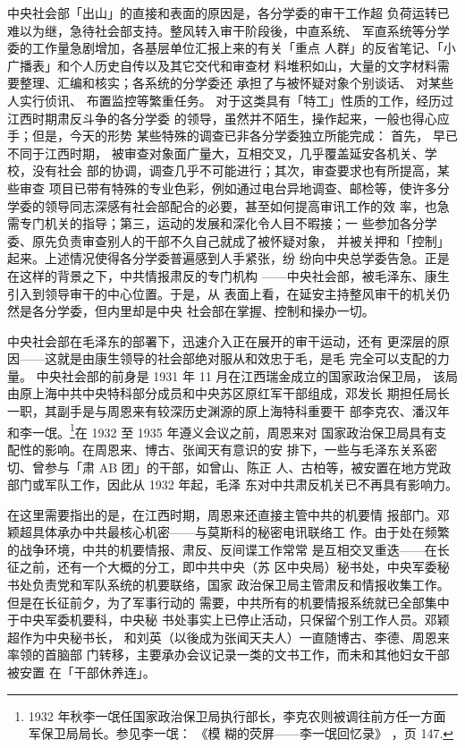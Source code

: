 中央社会部「出山」的直接和表面的原因是，各分学委的审干工作超
负荷运转已难以为继，急待社会部支持。整风转入审干阶段後，中直系统、
军直系统等分学委的工作量急剧增加，各基层单位汇报上来的有关「重点
人群」的反省笔记、「小广播表」和个人历史自传以及其它交代和审查材
料堆积如山，大量的文字材料需要整理、汇编和核实；各系统的分学委还
承担了与被怀疑对象个别谈话、
对某些人实行侦讯、
布置监控等繁重任务。
对于这类具有「特工」性质的工作，经历过江西时期肃反斗争的各分学委
的领导，虽然并不陌生，操作起来，一般也得心应手；但是，今天的形势
某些特殊的调查已非各分学委独立所能完成：
首先，
早已不同于江西时期，
被审查对象面广量大，互相交叉，几乎覆盖延安各机关、学校，没有社会
部的协调，调查几乎不可能进行；其次，审查要求也有所提高，某些审查
项目已带有特殊的专业色彩，例如通过电台异地调查、邮检等，使许多分
学委的领导同志深感有社会部配合的必要，甚至如何提高审讯工作的效
率，也急需专门机关的指导；第三，运动的发展和深化令人目不暇接；一
些参加各分学委、原先负责审查别人的干部不久自己就成了被怀疑对象，
并被关押和「控制」起来。上述情况使得各分学委普遍感到人手紧张，纷
纷向中央总学委告急。正是在这样的背景之下，中共情报肃反的专门机构
——中央社会部，被毛泽东、康生引入到领导审干的中心位置。于是，从
表面上看，在延安主持整风审干的机关仍然是各分学委，但内里却是中央
社会部在掌握、控制和操办一切。

中央社会部在毛泽东的部署下，迅速介入正在展开的审干运动，还有
更深层的原因——这就是由康生领导的社会部绝对服从和效忠于毛，是毛
完全可以支配的力量。
中央社会部的前身是 1931 年 11 月在江西瑞金成立的国家政治保卫局，
该局由原上海中共中央特科部分成员和中央苏区原红军干部组成，邓发长
期担任局长一职，其副手是与周恩来有较深历史渊源的原上海特科重要干
部李克农、潘汉年和李一氓。\footnote{ 1932 年秋李一氓任国家政治保卫局执行部长，李克农则被调往前方任一方面军保卫局局长。参见李一氓：
《模
糊的荧屏——李一氓回忆录》
，页 147. 
}在 1932 至 1935 年遵义会议之前，周恩来对
国家政治保卫局具有支配性的影响。在周恩来、博古、张闻天有意识的安
排下，一些与毛泽东关系密切、曾参与「肃 AB 团」的干部，如曾山、陈正
人、古柏等，被安置在地方党政部门或军队工作，因此从 1932 年起，毛泽
东对中共肃反机关已不再具有影响力。

在这里需要指出的是，在江西时期，周恩来还直接主管中共的机要情
报部门。邓颖超具体承办中共最核心机密——与莫斯科的秘密电讯联络工
作。由于处在频繁的战争环境，中共的机要情报、肃反、反间谍工作常常
是互相交叉重迭——在长征之前，还有一个大概的分工，即中共中央（苏
区中央局）秘书处，中央军委秘书处负责党和军队系统的机要联络，国家
政治保卫局主管肃反和情报收集工作。但是在长征前夕，为了军事行动的
需要，中共所有的机要情报系统就已全部集中于中央军委机要科，中央秘
书处事实上已停止活动，只保留个别工作人员。邓颖超作为中央秘书长，
和刘英（以後成为张闻天夫人）一直随博古、李德、周恩来率领的首脑部
门转移，主要承办会议记录一类的文书工作，而未和其他妇女干部被安置
在「干部休养连」。

